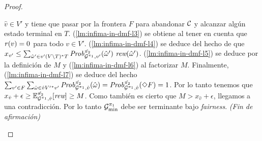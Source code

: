 \begin{proof}
\begin{proofofclaim}
    $\hat{v}\in V'$ y tiene que pasar por la frontera $F$ para abandonar $\mathcal{C}$ y alcanzar algún estado terminal en $T$.
    (\ref{lm:infima-in-dmf-l3}) se obtiene al tener en cuenta que $\mathit{r}(v) = 0$ para todo $v \in V'$.
    (\ref{lm:infima-in-dmf-l4}) se deduce del hecho de que 
    $x_{v'} \leq \sum_{\hat{\omega}' \in v' (V \setminus T)^*T}  \MDPProb{\hat{\strat{2}}}_{\StochG^{\strat{1}},v'}(\hat{\omega}')\ \Rewards(\hat{\omega}')$.
    (\ref{lm:infima-in-dmf-l5}) se deduce por la definición de $M$ y
    (\ref{lm:infima-in-dmf-l6}) al factorizar $M$.
    Finalmente, (\ref{lm:infima-in-dmf-l7}) se deduce del hecho 
    $\sum_{v' \in F} \sum_{\hat{\omega} \in \hat{v}{V'}^*v'} \mathit{Prob}^{\hat{\pi_{2}}}_{\mathcal{G}^{\pi_{1}},\hat{v}}(\hat{\omega}) =
    \mathit{Prob}^{\hat{\pi_{2}}}_{\mathcal{G}^{\pi_{1}},\hat{v}} (\Diamond F) = 1$.
    Por lo tanto tenemos que
    $x_{\hat{v}} + \epsilon \geq \mathbb{E}^{\hat{\pi_{2}}}_{\mathcal{G}^{\pi_{1}},\hat{v}}[\textit{rew}] \geq M$.
    Como también es cierto que $M >  x_{\hat{v}} + \epsilon$, llegamos a una contradicción.
    Por lo tanto $\mathcal{G}^{\pi_{1}}_{\min}$ debe ser terminante bajo \textit{fairness}.
    \hfill\emph{(Fin de afirmación)}\qedhere
  \end{proofofclaim}



\end{proof}
